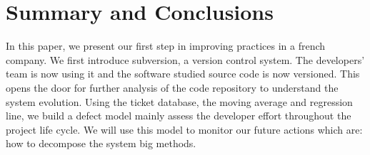 \documentclass[10pt,conference]{IEEEtran}
\begin{document}


\section{Summary and Conclusions}
\label{sec:conclusion}

In this paper, we present our first step in improving practices in a french company. We first introduce subversion, a version control system.
The developers' team is now using it and the software studied source code is now versioned.
This opens the door for further analysis of the code repository to understand the system evolution. 
Using the ticket database, the moving average and regression line, we build a defect model mainly assess the developer effort throughout the project life cycle. We will use this model to monitor our future actions which are: how to decompose the system big methods.

%


\vspace{12pt}
\end{document}
